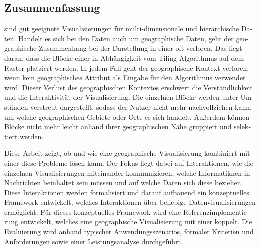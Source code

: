 \begin{otherlanguage}{german}
\chapter*{Zusammenfassung}

\tmaps{} sind gut geeignete Visualisierungen für multi-dimensionale und hierarchische Daten.
Handelt es sich bei den Daten auch um geographische Daten, geht der geographische Zusammenhang bei der Darstellung in einer \tmap{} oft verloren.
Das liegt daran, dass die Blöcke einer \tmap{} in Abhängigkeit vom Tiling-Algorithmus auf dem Raster platziert werden.
In jedem Fall geht der geographische Kontext verloren, wenn kein geographisches Attribut als Eingabe für den Algorithmus verwendet wird.
Dieser Verlust des geographischen Kontextes erschwert die Verständlichkeit und die Interaktivität der Visualisierung.
Die einzelnen Blöcke werden unter Umständen verstreut dargestellt, sodass der Nutzer nicht mehr nachvollziehen kann, um welche geographischen Gebiete oder Orte es sich handelt.
Außerdem können Blöcke nicht mehr leicht anhand ihrer geographischen Nähe gruppiert und selektiert werden.

Diese Arbeit zeigt, ob und wie eine geographische Visualisierung kombiniert mit einer \tmap{} diese Probleme lösen kann.
Der Fokus liegt dabei auf Interaktionen, wie die einzelnen Visualisierungen miteinander kommunizieren, welche Informatiknen in Nachrichten beinhaltet sein müssen und auf welche Daten sich diese beziehen.
Diese Interaktionen werden formalisiert und darauf aufbauend ein konzeptuelles Framework entwickelt, welches Interaktionen über beliebige Datenvisualisierungen ermöglicht.
Für dieses konzeptuelles Framework wird eine Referenzimplementierung entwickelt, welches eine geographische Visualisierung mit einer \tmap{} koppelt.
Die Evaluierung wird anhand typischer Anwendungsszenarios, formaler Kriterien und Anforderungen sowie einer Leistungsanalyse durchgeführt.

\end{otherlanguage}

